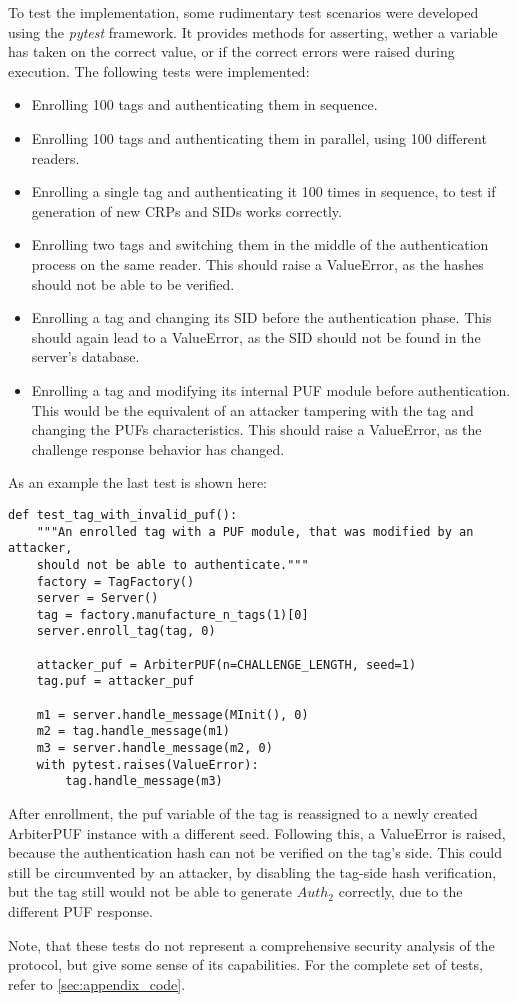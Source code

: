 To test the implementation, some rudimentary test scenarios were developed using the \emph{pytest} framework.
It provides methods for asserting, wether a variable has taken on the correct value, or
if the correct errors were raised during execution.
The following tests were implemented:
\begin{itemize}
    \item Enrolling 100 tags and authenticating them in sequence.
    \item Enrolling 100 tags and authenticating them in parallel, using 100 different readers.
    \item Enrolling a single tag and authenticating it 100 times in sequence,
          to test if generation of new CRPs and SIDs works correctly.
    \item Enrolling two tags and switching them in the middle of the authentication process
          on the same reader. This should raise a ValueError, as the hashes should not be able
          to be verified.
    \item Enrolling a tag and changing its SID before the authentication phase.
          This should again lead to a ValueError, as the SID should not be found in the server's
          database.
    \item Enrolling a tag and modifying its internal PUF module before authentication.
          This would be the equivalent of an attacker tampering with the tag and changing
          the PUFs characteristics. This should raise a ValueError, as the challenge response
          behavior has changed.
\end{itemize}

As an example the last test is shown here:

\begin{lstlisting}
def test_tag_with_invalid_puf():
    """An enrolled tag with a PUF module, that was modified by an attacker,
    should not be able to authenticate."""
    factory = TagFactory()
    server = Server()
    tag = factory.manufacture_n_tags(1)[0]
    server.enroll_tag(tag, 0)

    attacker_puf = ArbiterPUF(n=CHALLENGE_LENGTH, seed=1)
    tag.puf = attacker_puf

    m1 = server.handle_message(MInit(), 0)
    m2 = tag.handle_message(m1)
    m3 = server.handle_message(m2, 0)
    with pytest.raises(ValueError):
        tag.handle_message(m3)
\end{lstlisting}

After enrollment, the puf variable of the tag is reassigned to a newly created ArbiterPUF instance
with a different seed. Following this, a ValueError is raised, because the authentication hash
can not be verified on the tag's side.
This could still be circumvented by an attacker, by disabling the tag-side hash verification,
but the tag still would not be able to generate $Auth_2$ correctly, due to
the different PUF response.

Note, that these tests do not represent a comprehensive security analysis of the protocol, but give some sense
of its capabilities. For the complete set of tests, refer to \ref{sec:appendix_code}.